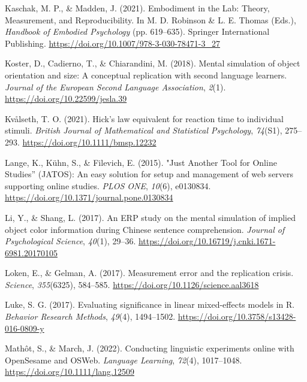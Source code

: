 \documentclass[
  man,floatsintext]{apa7}
\newlength{\cslhangindent}
\newlength{\cslentryspacingunit} %
\newenvironment{CSLReferences}[2] %
 {%
  \setlength{\parindent}{0pt}
  \ifodd #1
  \let\oldpar\par
  \def\par{\hangindent=\cslhangindent\oldpar}
  \fi
  \setlength{\parskip}{#2\cslentryspacingunit}
 }%
 {}
\begin{document}
\begin{CSLReferences}{1}{0}
\leavevmode{}%
Kaschak, M. P., \& Madden, J. (2021). Embodiment in the {Lab}: {Theory}, {Measurement}, and {Reproducibility}. In M. D. Robinson \& L. E. Thomas (Eds.), \emph{Handbook of {Embodied Psychology}} (pp. 619--635). {Springer International Publishing}. \url{https://doi.org/10.1007/978-3-030-78471-3_27}

\leavevmode{}%
Koster, D., Cadierno, T., \& Chiarandini, M. (2018). Mental simulation of object orientation and size: {A} conceptual replication with second language learners. \emph{Journal of the European Second Language Association}, \emph{2}(1). \url{https://doi.org/10.22599/jesla.39}

\leavevmode{}%
Kvålseth, T. O. (2021). Hick's law equivalent for reaction time to individual stimuli. \emph{British Journal of Mathematical and Statistical Psychology}, \emph{74}(S1), 275--293. \url{https://doi.org/10.1111/bmsp.12232}

\leavevmode{}%
Lange, K., Kühn, S., \& Filevich, E. (2015). "{Just Another Tool} for {Online Studies}'' ({JATOS}): {An} easy solution for setup and management of web servers supporting online studies. \emph{PLOS ONE}, \emph{10}(6), e0130834. \url{https://doi.org/10.1371/journal.pone.0130834}

\leavevmode{}%
Li, Y., \& Shang, L. (2017). {An ERP study on the mental simulation of implied object color information during Chinese sentence comprehension}. \emph{Journal of Psychological Science}, \emph{40}(1), 29--36. \url{https://doi.org/10.16719/j.cnki.1671-6981.20170105}

\leavevmode{}%
Loken, E., \& Gelman, A. (2017). Measurement error and the replication crisis. \emph{Science}, \emph{355}(6325), 584--585. \url{https://doi.org/10.1126/science.aal3618}

\leavevmode{}%
Luke, S. G. (2017). Evaluating significance in linear mixed-effects models in {R}. \emph{Behavior Research Methods}, \emph{49}(4), 1494--1502. \url{https://doi.org/10.3758/s13428-016-0809-y}

\leavevmode{}%
Mathôt, S., \& March, J. (2022). Conducting {linguistic} {experiments} {online} {with} {OpenSesame} and {OSWeb}. \emph{Language Learning}, \emph{72}(4), 1017--1048. \url{https://doi.org/10.1111/lang.12509}


\end{CSLReferences}
\end{document}
